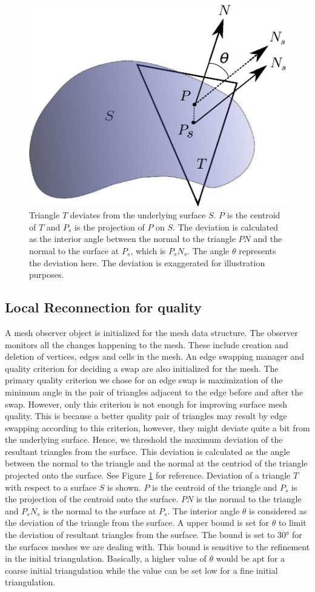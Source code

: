 \documentclass[conf]{new-aiaa}
\begin{document}
\begin{figure}[hbt!]
    \centering
    \includegraphics[width=.3\textwidth]{deviate-surface.eps}
    \caption{Triangle $T$ deviates from the underlying surface $S$. $P$ is the centroid of $T$ and $P_s$ is the projection of $P$ on $S$. The deviation is calculated as the interior angle between the normal to the triangle $PN$ and the normal to the surface at $P_s$, which is $P_sN_s$. The angle $\theta$ represents the deviation here. The deviation is exaggerated for illustration purposes.}
    \label{deviation-surface}
\end{figure}

\subsection{Local Reconnection for quality}

A mesh observer object is initialized for the mesh data structure. The observer monitors all the changes happening to the mesh. These include creation and deletion of vertices, edges and cells in the mesh. An edge swapping manager and quality criterion for deciding a swap are also initialized for the mesh. The primary quality criterion we chose for an edge swap is maximization of the minimum angle in the pair of triangles adjacent to the edge before and after the swap. However, only this criterion is not enough for improving surface mesh quality. This is because a better quality pair of triangles may result by edge swapping according to this criterion, however, they might deviate quite a bit from the underlying surface. Hence, we threshold the maximum deviation of the resultant triangles from the surface. This deviation is calculated as the angle between the normal to the triangle and the normal at the centriod of the triangle projected onto the surface. See Figure \ref{deviation-surface} for reference. Deviation of a triangle $T$ with respect to a surface $S$ is shown. $P$ is the centroid of the triangle and $P_s$ is the projection of the centroid onto the surface. $PN$ is the normal to the triangle and $P_sN_s$ is the normal to the surface at $P_s$. The interior angle $\theta$ is considered as the deviation of the triangle from the surface. A upper bound is set for $\theta$ to limit the deviation of resultant triangles from the surface.  The bound is set to $\ang{30}$ for the surfaces meshes we are dealing with. This bound is sensitive to the refinement in the initial triangulation. Basically, a higher value of $\theta$ would be apt for a coarse initial triangulation while the value can be set low for a fine initial triangulation.
\end{document}
